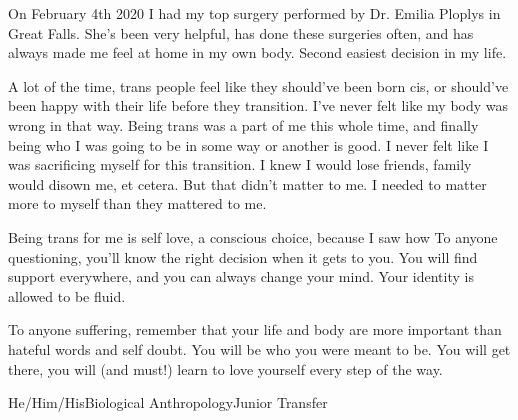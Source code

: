 {On February 4th 2020 I had my top surgery performed by Dr. Emilia Ploplys in 
Great Falls. She's been very helpful, has done these surgeries often, and has
always made me feel at home in my own body. Second easiest decision in my life.

A lot of the time, trans people feel like they should've been born cis, or
should've been happy with their life before they transition. I've never felt
like my body was wrong in that way. Being trans was a part of me this whole
time, and finally being who I was going to be in some way or another is good. I
never felt like I was sacrificing myself for this transition. I knew I would
lose friends, family would disown me, et cetera. But that didn't matter to me.
I needed to matter more to myself than they mattered to me.

Being trans for me is self love, a conscious choice, because I saw how
To anyone questioning, you'll know the right decision when it gets to you. You
will find support everywhere, and you can always change your mind. Your
identity is allowed to be fluid.

To anyone suffering, remember that your life and body are more important than
hateful words and self doubt. You will be who you were meant to be. You will
get there, you will (and must!) learn to love yourself every step of the way.}
{He/Him/His}{Biological Anthropology}{Junior Transfer}
